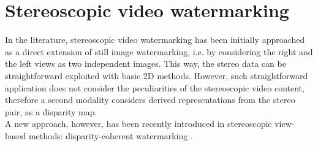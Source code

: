 \section{Stereoscopic video watermarking}

In the literature, stereoscopic video watermarking has been initially approached as a direct extension of still image watermarking, i.e. by considering the right and the left views as two independent images. This way, the stereo data can be straightforward exploited with basic 2D methods. However, such straightforward application does not consider the peculiarities of the stereoscopic video content, therefore a second modality considers derived representations from the stereo pair, as a disparity map.\\ 
A new approach, however, has been recently introduced in stereoscopic view-based methods: disparity-coherent watermarking \cite{DOER}.

